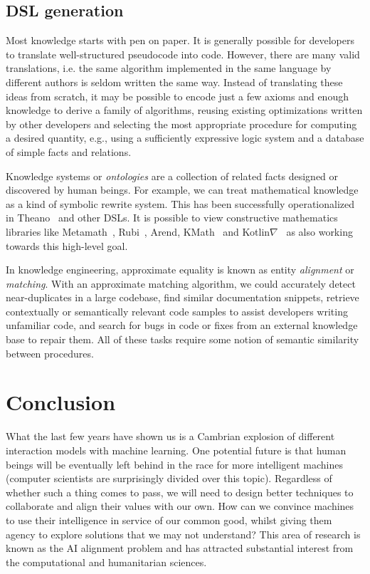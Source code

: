 \documentclass[10pt]{article}
\begin{document}
  \subsection{DSL generation}\label{subsec:gen}

Most knowledge starts with pen on paper. It is generally possible for developers to translate well-structured pseudocode into code. However, there are many valid translations, i.e. the same algorithm implemented in the same language by different authors is seldom written the same way. Instead of translating these ideas from scratch, it may be possible to encode just a few axioms and enough knowledge to derive a family of algorithms, reusing existing optimizations written by other developers and selecting the most appropriate procedure for computing a desired quantity, e.g., using a sufficiently expressive logic system and a database of simple facts and relations.

Knowledge systems or \textit{ontologies} are a collection of related facts designed or discovered by human beings. For example, we can treat mathematical knowledge as a kind of symbolic rewrite system. This has been successfully operationalized in Theano~\cite{bergstra2010theano} and other DSLs. It is possible to view constructive mathematics libraries like Metamath~\cite{megill2006metamath}, Rubi~\cite{rich2009knowledge}, Arend, KMath~\cite{nozik2019kotlin} and Kotlin$\nabla$~\cite{considine2019kotlingrad} as also working towards this high-level goal.

In knowledge engineering, approximate equality is known as entity \textit{alignment} or \textit{matching}. With an approximate matching algorithm, we could accurately detect near-duplicates in a large codebase, find similar documentation snippets, retrieve contextually or semantically relevant code samples to assist developers writing unfamiliar code, and search for bugs in code or fixes from an external knowledge base to repair them. All of these tasks require some notion of semantic similarity between procedures.

\section{Conclusion}

What the last few years have shown us is a Cambrian explosion of different interaction models with machine learning. One potential future is that human beings will be eventually left behind in the race for more intelligent machines (computer scientists are surprisingly divided over this topic). Regardless of whether such a thing comes to pass, we will need to design better techniques to collaborate and align their values with our own. How can we convince machines to use their intelligence in service of our common good, whilst giving them agency to explore solutions that we may not understand? This area of research is known as the AI alignment problem and has attracted substantial interest from the computational and humanitarian sciences.
\end{document}
